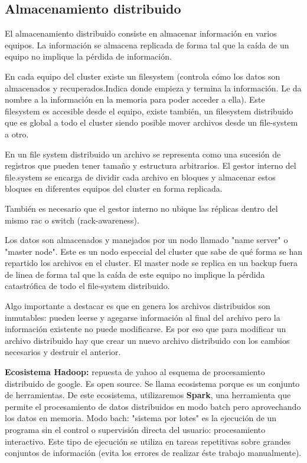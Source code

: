 \documentclass[titlepage,a4paper]{article}
\begin{document}
\subsection*{Almacenamiento distribuido}
El almacenamiento distribuido consiste en almacenar información en varios equipos. La información se almacena replicada de forma tal que la caída de un equipo no implique la pérdida de información. 

En cada equipo del cluster existe  un filesystem (controla cómo los datos son almacenados y recuperados.Indica donde empieza y termina la información. Le da nombre a la información en la memoria para poder acceder a ella). Este filesystem es accesible desde el equipo, existe también, un filesystem distribuido que es global a todo el cluster siendo posible mover archivos desde un file-system a otro. 

En un file system distribuido un archivo se representa como una sucesión de registros que pueden tener tamaño y estructura arbitrarios. El gestor interno del file.system se encarga de dividir cada archivo en bloques y almacenar estos bloques en diferentes equipos del cluster en forma replicada. 

También es necesario que el gestor interno no ubique las réplicas dentro del mismo rac o switch (rack-awareness).

Los datos son almacenados y manejados por un nodo llamado "name server" o "master node". Este es un nodo especcial del cluster que sabe de qué forma se han  repartido los archivos en el cluster. El master node se replica en un backup fuera de linea de forma tal que la caída de este equipo no implique la pérdida catastrófica de todo el file-system distribuido. 

Algo importante a destacar es que en genera los archivos distribuidos son inmutables: pueden leerse y agegarse información al final del archivo pero la información existente no puede modificarse. Es por eso que para modificar un archivo distribuido hay que crear un nuevo archivo distribuido con los cambios necesarios y destruir el anterior. 

\textbf{Ecosistema Hadoop:} repuesta de yahoo al esquema de procesamiento distribuido de google. Es open source. Se llama ecosistema porque es un conjunto de herramientas. De este ecosistema, utilizaremos \textbf{Spark}, una herramienta que permite el procesamiento de datos distribuidos en modo batch pero aprovechando los datos en memoria. Modo bach: "sistema por lotes" es la ejecución de un programa sin el control o supervisión directa del usuario: procesamiento interactivo. Este tipo de ejecución se utiliza en tareas repetitivas sobre grandes conjuntos de información (evita los errores de realizar éste trabajo manualmente). 
\end{document}
